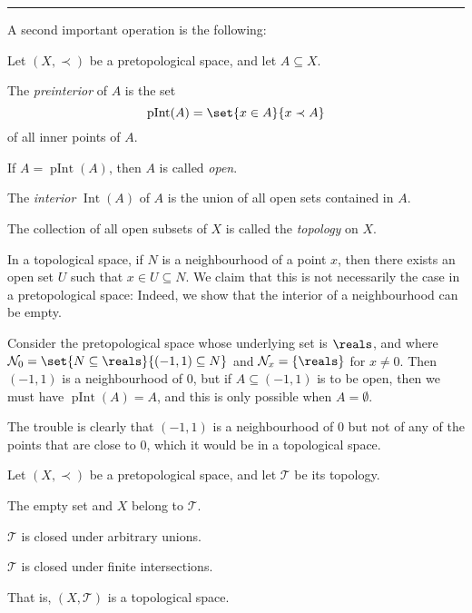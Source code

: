 \documentclass[article, a4paper, 11pt, oneside]{memoir}
\numberwithin{equation}{chapter}
\newcommand{\calT}{\mathcal{T}}
\newcommand{\inpoint}{\prec}
\newcommand{\calN}{\mathcal{N}}
\newcommand{\nhoods}[1]{\calN_{#1}}
\newcommand{\pInt}[1]{\operatorname{pInt}(#1)}
\renewcommand{\interior}[1]{\operatorname{Int}(#1)}
\newcommand\fleuronbreak{\fancybreak{\textcolor{linkcolor}{\adfhangingflatleafleft}}}
\begin{document}
\fleuronbreak

A second important operation is the following:

\begin{definition}
    Let $(X,\inpoint)$ be a pretopological space, and let $A \subseteq X$.
    \begin{enumdef}
        \item The \emph{preinterior} of $A$ is the set
        \begin{equation*}
            \pInt{A}
                = \set{x \in A}{x \inpoint A}
        \end{equation*}
        of all inner points of $A$.

        \item If $A = \pInt{A}$, then $A$ is called \emph{open}.
        
        \item The \emph{interior} $\interior{A}$ of $A$ is the union of all open sets contained in $A$.
    \end{enumdef}
    The collection of all open subsets of $X$ is called the \emph{topology} on $X$.
\end{definition}

\begin{remark}
    \label{rem:interior-empty}
    In a topological space, if $N$ is a neighbourhood of a point $x$, then there exists an open set $U$ such that $x \in U \subseteq N$. We claim that this is not necessarily the case in a pretopological space: Indeed, we show that the interior of a neighbourhood can be empty.

    Consider the pretopological space whose underlying set is $\reals$, and where $\nhoods{0} = \set{N \subseteq \reals}{(-1,1) \subseteq N}$ and $\nhoods{x} = \{\reals\}$ for $x \neq 0$. Then $(-1,1)$ is a neighbourhood of $0$, but if $A \subseteq (-1,1)$ is to be open, then we must have $\pInt{A} = A$, and this is only possible when $A = \emptyset$.

    The trouble is clearly that $(-1,1)$ is a neighbourhood of $0$ but not of any of the points that are close to $0$, which it would be in a topological space.
\end{remark}

\begin{proposition}
    \label{thm:open-sets-constitute-topology}
    Let $(X,\inpoint)$ be a pretopological space, and let $\calT$ be its topology.
    \begin{enumprop}
        \item \label{enum:topology-emptyset+X} The empty set and $X$ belong to $\calT$.
        \item \label{enum:topology-unions} $\calT$ is closed under arbitrary unions.
        \item \label{enum:topology-intersections} $\calT$ is closed under finite intersections.
    \end{enumprop}
    That is, $(X,\calT)$ is a topological space.
\end{proposition}
\end{document}
